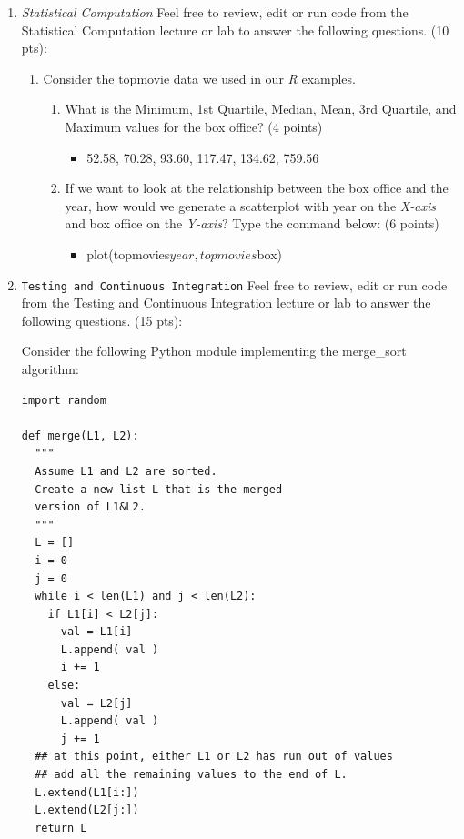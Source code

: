 \documentclass[10pt]{article}
\begin{document}
\begin{enumerate}
\begin{enumerate}
	\end{enumerate}

\newpage

\item \textit{Statistical Computation} Feel free to review, edit or run code from the Statistical Computation lecture or lab to answer the following questions. (10 pts):
\begin{enumerate}
	\item Consider the topmovie data we used in our \textit{R} examples. 
	\begin{enumerate}
		\item What is the Minimum, 1st Quartile, Median, Mean, 3rd Quartile, and Maximum values for the box office? (4 points)
		\beginanswers
		\begin{itemize}
			\item 52.58, 70.28, 93.60, 117.47, 134.62, 759.56
		\end{itemize}
		\else
		\bigskip
		\bigskip
		\bigskip
		\bigskip
		\item If we want to look at the relationship between the box office and the year, how would we generate a scatterplot with year on the \textit{X-axis} and box office on the \textit{Y-axis}? Type the command below: (6 points)
		\beginanswers
		\begin{itemize}
			\item plot(topmovies$year, topmovies$box)
		\end{itemize}
		\else
		\bigskip
		\bigskip
		\bigskip
		\bigskip
	\end{enumerate}
		
\end{enumerate}

\newpage


\item \texttt{Testing and Continuous Integration} Feel free to review, edit or run code from the Testing and Continuous Integration lecture or lab to answer the following questions. (15 pts):
\bigskip

Consider the following Python module implementing the merge\_sort algorithm:
\begin{verbatim}
import random

def merge(L1, L2):
  """
  Assume L1 and L2 are sorted.
  Create a new list L that is the merged
  version of L1&L2.
  """
  L = []
  i = 0
  j = 0
  while i < len(L1) and j < len(L2):
    if L1[i] < L2[j]:
      val = L1[i]
      L.append( val )
      i += 1
    else:
      val = L2[j]
      L.append( val )
      j += 1
  ## at this point, either L1 or L2 has run out of values
  ## add all the remaining values to the end of L.
  L.extend(L1[i:]) 
  L.extend(L2[j:])
  return L


\end{verbatim}
\end{enumerate}
\end{document}
